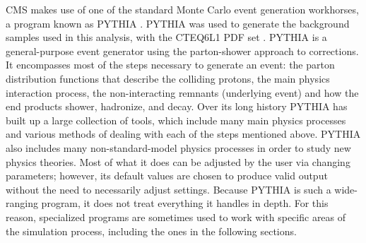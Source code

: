 




CMS makes use of one of the standard 
Monte Carlo event generation workhorses, 
a program known as PYTHIA 
\cite{PYTHIA6.4}. 
PYTHIA was used to generate the background 
samples used in this analysis, 
with the CTEQ6L1 PDF set \cite{CTEQ6L1}.  
PYTHIA is a general-purpose event generator 
using the parton-shower approach to corrections.  
It encompasses most of the steps necessary to generate 
an event: 
the parton distribution functions 
that describe the colliding protons, 
the main physics interaction process, 
the non-interacting remnants (underlying event)
and how the end products shower, 
hadronize, and decay.  
Over its long history PYTHIA has built up 
a large collection of tools, 
which include many main physics processes and 
various methods of dealing with each of the steps 
mentioned above.  
PYTHIA also includes many non-standard-model 
physics processes 
in order to study new physics theories.  
Most of what it does can be adjusted by the user 
via changing parameters; 
however, its default values are chosen to produce 
valid output without the need to 
necessarily adjust settings.  
Because PYTHIA is such a wide-ranging program, 
it does not treat everything it handles in depth.  
For this reason, specialized programs are sometimes used 
to work with specific areas of the simulation process, 
including the ones in the following sections.  


